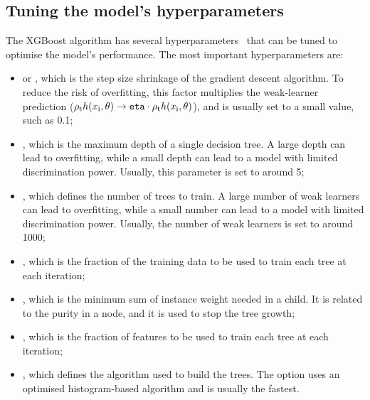 \subsection{Tuning the model's hyperparameters}
The XGBoost algorithm has several hyperparameters~\cite{XGBoost_parameters} that can be tuned to optimise the model's performance. The most important hyperparameters are:
\begin{itemize}
    \item {} or , which is the step size shrinkage of the gradient descent algorithm. To reduce the risk of overfitting, this factor multiplies the weak-learner prediction ($\rho_\mathrm{t} h(x_\mathrm{i},\theta) \rightarrow \texttt{eta} \cdot \rho_\mathrm{t} h(x_\mathrm{i},\theta)$), and is usually set to a small value, such as 0.1;
    \item {}, which is the maximum depth of a single decision tree. A large depth can lead to overfitting, while a small depth can lead to a model with limited discrimination power. Usually, this parameter is set to around 5;
    \item {}, which defines the number of trees to train. A large number of weak learners can lead to overfitting, while a small number can lead to a model with limited discrimination power. Usually, the number of weak learners is set to around 1000;
    \item {}, which is the fraction of the training data to be used to train each tree at each iteration;
    \item {}, which is the minimum sum of instance weight needed in a child. It is related to the purity in a node, and it is used to stop the tree growth;
    \item {}, which is the fraction of features to be used to train each tree at each iteration;
    \item {}, which defines the algorithm used to build the trees. The  option uses an optimised histogram-based algorithm and is usually the fastest.
\end{itemize}

